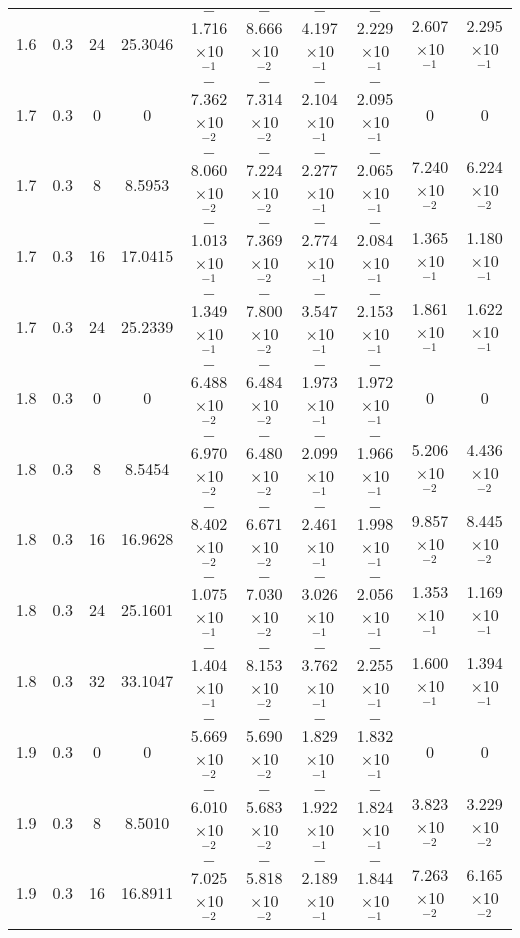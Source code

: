 \documentclass[aps,prd,twocolumn,showpacs,groupedaddress,nofootinbib]{revtex4}
\begin{document}
\begin{widetext}
\begin{table}[h]
\begin{tabular}{|c|c|c|c|c|c|c|c|c|c|}
  1.6&  0.3& 24& 25.3046& $-$1.716$\times$10$^{-1}$& $-$8.666$\times$10$^{-2}$& $-$4.197$\times$10$^{-1}$& $-$2.229$\times$10$^{-1}$&  2.607$\times$10$^{-1}$&    2.295$\times$10$^{-1}$\\
  1.7&  0.3&  0&  0& $-$7.362$\times$10$^{-2}$& $-$7.314$\times$10$^{-2}$& $-$2.104$\times$10$^{-1}$& $-$2.095$\times$10$^{-1}$&  0&    0\\
  1.7&  0.3&  8&  8.5953& $-$8.060$\times$10$^{-2}$& $-$7.224$\times$10$^{-2}$& $-$2.277$\times$10$^{-1}$& $-$2.065$\times$10$^{-1}$&  7.240$\times$10$^{-2}$&    6.224$\times$10$^{-2}$\\
  1.7&  0.3& 16& 17.0415& $-$1.013$\times$10$^{-1}$& $-$7.369$\times$10$^{-2}$& $-$2.774$\times$10$^{-1}$& $-$2.084$\times$10$^{-1}$&  1.365$\times$10$^{-1}$&    1.180$\times$10$^{-1}$\\
  1.7&  0.3& 24& 25.2339& $-$1.349$\times$10$^{-1}$& $-$7.800$\times$10$^{-2}$& $-$3.547$\times$10$^{-1}$& $-$2.153$\times$10$^{-1}$&  1.861$\times$10$^{-1}$&    1.622$\times$10$^{-1}$\\
  1.8&  0.3&  0&  0& $-$6.488$\times$10$^{-2}$& $-$6.484$\times$10$^{-2}$& $-$1.973$\times$10$^{-1}$& $-$1.972$\times$10$^{-1}$&  0&   0\\
  1.8&  0.3&  8&  8.5454& $-$6.970$\times$10$^{-2}$& $-$6.480$\times$10$^{-2}$& $-$2.099$\times$10$^{-1}$& $-$1.966$\times$10$^{-1}$&  5.206$\times$10$^{-2}$&    4.436$\times$10$^{-2}$\\
  1.8&  0.3& 16& 16.9628& $-$8.402$\times$10$^{-2}$& $-$6.671$\times$10$^{-2}$& $-$2.461$\times$10$^{-1}$& $-$1.998$\times$10$^{-1}$&  9.857$\times$10$^{-2}$&    8.445$\times$10$^{-2}$\\
  1.8&  0.3& 24& 25.1601& $-$1.075$\times$10$^{-1}$& $-$7.030$\times$10$^{-2}$& $-$3.026$\times$10$^{-1}$& $-$2.056$\times$10$^{-1}$&  1.353$\times$10$^{-1}$&    1.169$\times$10$^{-1}$\\
  1.8&  0.3& 32& 33.1047& $-$1.404$\times$10$^{-1}$& $-$8.153$\times$10$^{-2}$& $-$3.762$\times$10$^{-1}$& $-$2.255$\times$10$^{-1}$&  1.600$\times$10$^{-1}$&    1.394$\times$10$^{-1}$\\
  1.9&  0.3&  0&  0& $-$5.669$\times$10$^{-2}$& $-$5.690$\times$10$^{-2}$& $-$1.829$\times$10$^{-1}$& $-$1.832$\times$10$^{-1}$&  0&    0\\
  1.9&  0.3&  8&  8.5010& $-$6.010$\times$10$^{-2}$& $-$5.683$\times$10$^{-2}$& $-$1.922$\times$10$^{-1}$& $-$1.824$\times$10$^{-1}$&  3.823$\times$10$^{-2}$&    3.229$\times$10$^{-2}$\\
  1.9&  0.3& 16& 16.8911& $-$7.025$\times$10$^{-2}$& $-$5.818$\times$10$^{-2}$& $-$2.189$\times$10$^{-1}$& $-$1.844$\times$10$^{-1}$&  7.263$\times$10$^{-2}$&    6.165$\times$10$^{-2}$\\

\end{tabular}
\end{table}
\end{widetext}
\end{document}
